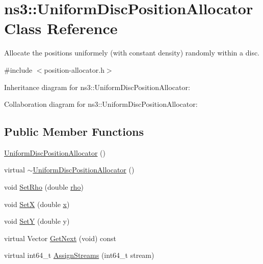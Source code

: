 \hypertarget{classns3_1_1UniformDiscPositionAllocator}{}\section{ns3\+:\+:Uniform\+Disc\+Position\+Allocator Class Reference}
\label{classns3_1_1UniformDiscPositionAllocator}


Allocate the positions uniformely (with constant density) randomly within a disc.  




{\ttfamily \#include $<$position-\/allocator.\+h$>$}



Inheritance diagram for ns3\+:\+:Uniform\+Disc\+Position\+Allocator\+:


Collaboration diagram for ns3\+:\+:Uniform\+Disc\+Position\+Allocator\+:
\subsection*{Public Member Functions}
\begin{DoxyCompactItemize}
\item 
\hyperlink{classns3_1_1UniformDiscPositionAllocator_ad544cce2573d5109d540768323ac809a}{Uniform\+Disc\+Position\+Allocator} ()
\item 
virtual \hyperlink{classns3_1_1UniformDiscPositionAllocator_a5b0b26f5d5348913b4ad74e9952f31b9}{$\sim$\+Uniform\+Disc\+Position\+Allocator} ()
\item 
void \hyperlink{classns3_1_1UniformDiscPositionAllocator_a0ae7ad48caebd9801c264e2d6a02df5a}{Set\+Rho} (double \hyperlink{loss__ITU1411__NLOS__over__rooftop_8m_ab8ec92cc3ea8422c9349409bae98d2a0}{rho})
\item 
void \hyperlink{classns3_1_1UniformDiscPositionAllocator_a0936373bf5e0afd20c8e291f6d6ab481}{SetX} (double \hyperlink{lte__link__budget__x2__handover__measures_8m_a9336ebf25087d91c818ee6e9ec29f8c1}{x})
\item 
void \hyperlink{classns3_1_1UniformDiscPositionAllocator_a4da863f21ad55bd9a9f6fb243cdcbb65}{SetY} (double y)
\item 
virtual Vector \hyperlink{classns3_1_1UniformDiscPositionAllocator_ab1c13510d6c7ac3ccae4b37a4e99f75c}{Get\+Next} (void) const 
\item 
virtual int64\+\_\+t \hyperlink{classns3_1_1UniformDiscPositionAllocator_a505c7075d7eaf140502f0597d974164d}{Assign\+Streams} (int64\+\_\+t stream)
\end{DoxyCompactItemize}
